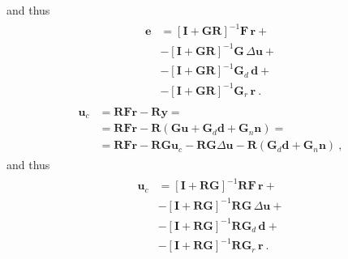 \documentclass[letterpaper,10pt,english]{jupyterBook}
\begin{document}
\sphinxAtStartPar
and thus
\begin{equation*}
\begin{split}\begin{aligned}
  \mathbf{e}
  & = \left[ \mathbf{I} + \mathbf{G} \mathbf{R} \right]^{-1} \mathbf{F}   \, \mathbf{r} + \\
  & - \left[ \mathbf{I} + \mathbf{G} \mathbf{R} \right]^{-1} \mathbf{G}   \, \Delta  \mathbf{u} + \\
  & - \left[ \mathbf{I} + \mathbf{G} \mathbf{R} \right]^{-1} \mathbf{G}_d \, \mathbf{d} + \\
  & - \left[ \mathbf{I} + \mathbf{G} \mathbf{R} \right]^{-1} \mathbf{G}_r \, \mathbf{r} \ .
\end{aligned}\end{split}
\end{equation*}
\sphinxAtStartPar
{}
\begin{equation*}
\begin{split}\begin{aligned}
  \mathbf{u}_c 
  & = \mathbf{R} \mathbf{F} \mathbf{r} - \mathbf{R} \mathbf{y} = \\
  & = \mathbf{R} \mathbf{F} \mathbf{r} - \mathbf{R} \left( \mathbf{G} \mathbf{u} + \mathbf{G}_d \mathbf{d} + \mathbf{G}_n \mathbf{n} \right) = \\
  & = \mathbf{R} \mathbf{F} \mathbf{r} - \mathbf{R} \mathbf{G} \mathbf{u}_c - \mathbf{R} \mathbf{G} \Delta \mathbf{u} - \mathbf{R} \left( \mathbf{G}_d \mathbf{d} + \mathbf{G}_n \mathbf{n} \right) \ ,
\end{aligned}\end{split}
\end{equation*}
\sphinxAtStartPar
and thus
\begin{equation*}
\begin{split}\begin{aligned}
  \mathbf{u}_c
  & = \left[ \mathbf{I} + \mathbf{R} \mathbf{G} \right]^{-1} \mathbf{R} \mathbf{F}   \, \mathbf{r} + \\
  & - \left[ \mathbf{I} + \mathbf{R} \mathbf{G} \right]^{-1} \mathbf{R} \mathbf{G}   \, \Delta  \mathbf{u} + \\
  & - \left[ \mathbf{I} + \mathbf{R} \mathbf{G} \right]^{-1} \mathbf{R} \mathbf{G}_d \, \mathbf{d} + \\
  & - \left[ \mathbf{I} + \mathbf{R} \mathbf{G} \right]^{-1} \mathbf{R} \mathbf{G}_r \, \mathbf{r} \ .
\end{aligned}\end{split}
\end{equation*}
\end{document}

